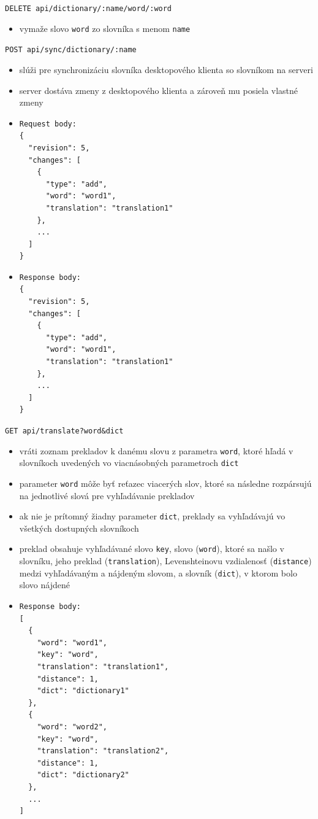 \documentclass[
  digital, %
  table,   %
  lof,     %
  lot,     %
]{fithesis3}
\begin{document}
\noindent
\texttt{DELETE api/dictionary/:name/word/:word}
\begin{itemize}
\item vymaže slovo \texttt{word} zo slovníka s menom \texttt{name}
\end{itemize}

\noindent
\texttt{POST api/sync/dictionary/:name}
\begin{itemize}
\item slúži pre synchronizáciu slovníka desktopového klienta so slovníkom na serveri
\item server dostáva zmeny z desktopového klienta a zároveň mu posiela vlastné zmeny
\item \begin{lstlisting}[basicstyle=\small]
Request body:
{
  "revision": 5,
  "changes": [
    {
      "type": "add",
      "word": "word1",
      "translation": "translation1"
    },
    ...
  ]
}
\end{lstlisting}
\item \begin{lstlisting}[basicstyle=\small]
Response body:
{
  "revision": 5,
  "changes": [
    {
      "type": "add",
      "word": "word1",
      "translation": "translation1"
    },
    ...
  ]
}
\end{lstlisting}
\end{itemize}

\noindent
\texttt{GET api/translate?word\&dict}
\begin{itemize}
\item vráti zoznam prekladov k danému slovu z parametra \texttt{word}, ktoré hľadá v slovníkoch uvedených vo viacnásobných parametroch \texttt{dict}
\item parameter \texttt{word} môže byť reťazec viacerých slov, ktoré sa následne rozpársujú na jednotlivé slová pre vyhľadávanie prekladov
\item ak nie je prítomný žiadny parameter \texttt{dict}, preklady sa vyhľadávajú vo všetkých dostupných slovníkoch
\item preklad obsahuje vyhľadávané slovo \texttt{key}, slovo (\texttt{word}), ktoré sa našlo v slovníku, jeho preklad (\texttt{translation}), Levenshteinovu vzdialenosť (\texttt{distance}) medzi vyhľadávaným a nájdeným slovom, a slovník (\texttt{dict}), v ktorom bolo slovo nájdené
\item \begin{lstlisting}[basicstyle=\small]
Response body:
[
  {
    "word": "word1",
    "key": "word",
    "translation": "translation1",
    "distance": 1,
    "dict": "dictionary1"
  },
  {
    "word": "word2",
    "key": "word",
    "translation": "translation2",
    "distance": 1,
    "dict": "dictionary2"
  },
  ...
]
\end{lstlisting}
\end{itemize}
\end{document}
